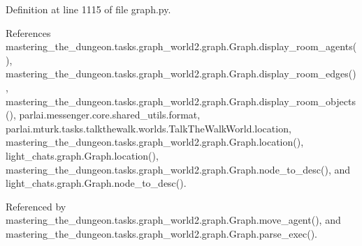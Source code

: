 Definition at line 1115 of file graph.\+py.



References mastering\+\_\+the\+\_\+dungeon.\+tasks.\+graph\+\_\+world2.\+graph.\+Graph.\+display\+\_\+room\+\_\+agents(), mastering\+\_\+the\+\_\+dungeon.\+tasks.\+graph\+\_\+world2.\+graph.\+Graph.\+display\+\_\+room\+\_\+edges(), mastering\+\_\+the\+\_\+dungeon.\+tasks.\+graph\+\_\+world2.\+graph.\+Graph.\+display\+\_\+room\+\_\+objects(), parlai.\+messenger.\+core.\+shared\+\_\+utils.\+format, parlai.\+mturk.\+tasks.\+talkthewalk.\+worlds.\+Talk\+The\+Walk\+World.\+location, mastering\+\_\+the\+\_\+dungeon.\+tasks.\+graph\+\_\+world2.\+graph.\+Graph.\+location(), light\+\_\+chats.\+graph.\+Graph.\+location(), mastering\+\_\+the\+\_\+dungeon.\+tasks.\+graph\+\_\+world2.\+graph.\+Graph.\+node\+\_\+to\+\_\+desc(), and light\+\_\+chats.\+graph.\+Graph.\+node\+\_\+to\+\_\+desc().



Referenced by mastering\+\_\+the\+\_\+dungeon.\+tasks.\+graph\+\_\+world2.\+graph.\+Graph.\+move\+\_\+agent(), and mastering\+\_\+the\+\_\+dungeon.\+tasks.\+graph\+\_\+world2.\+graph.\+Graph.\+parse\+\_\+exec().

